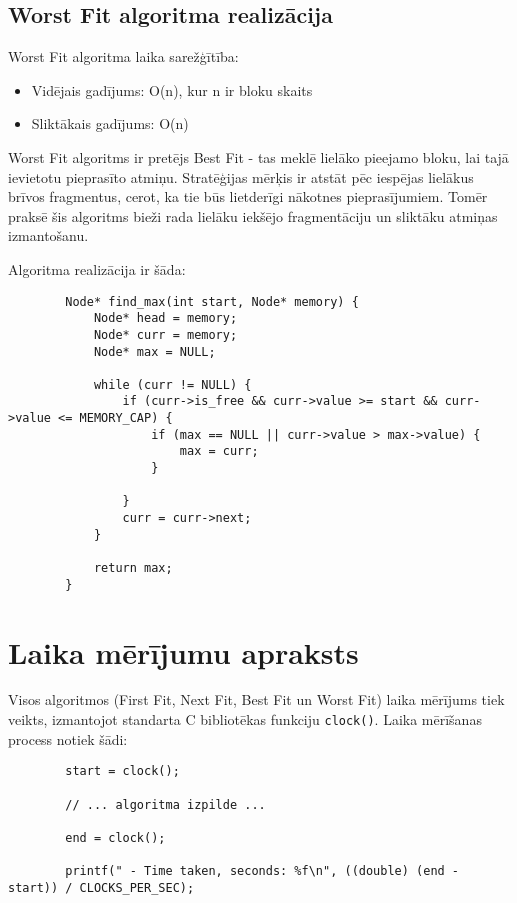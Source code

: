 \documentclass{report}
\begin{document}
	\subsection{Worst Fit algoritma realizācija}
	
	Worst Fit algoritma laika sarežģītība:
	\begin{itemize}
		\item Vidējais gadījums: O(n), kur n ir bloku skaits
		\item Sliktākais gadījums: O(n)
	\end{itemize}
	
	Worst Fit algoritms ir pretējs Best Fit - tas meklē lielāko pieejamo bloku, lai tajā ievietotu pieprasīto atmiņu. Stratēģijas mērķis ir atstāt pēc iespējas lielākus brīvos fragmentus, cerot, ka tie būs lietderīgi nākotnes pieprasījumiem. Tomēr praksē šis algoritms bieži rada lielāku iekšējo fragmentāciju un sliktāku atmiņas izmantošanu.
	
	Algoritma realizācija ir šāda:
	
	\begin{verbatim}
		Node* find_max(int start, Node* memory) {
			Node* head = memory;
			Node* curr = memory;
			Node* max = NULL;
			
			while (curr != NULL) {
				if (curr->is_free && curr->value >= start && curr->value <= MEMORY_CAP) {
					if (max == NULL || curr->value > max->value) {
						max = curr;
					}
					
				}
				curr = curr->next;
			}
			
			return max; 
		}
	\end{verbatim}
	
	\section{Laika mērījumu apraksts}
	
	Visos algoritmos (First Fit, Next Fit, Best Fit un Worst Fit) laika mērījums tiek veikts, izmantojot standarta C bibliotēkas funkciju \texttt{clock()}. Laika mērīšanas process notiek šādi:
	
	\begin{verbatim}
		start = clock();
		
		// ... algoritma izpilde ...
		
		end = clock();
		
		printf(" - Time taken, seconds: %f\n", ((double) (end - start)) / CLOCKS_PER_SEC);
	\end{verbatim}
	
\end{document}
